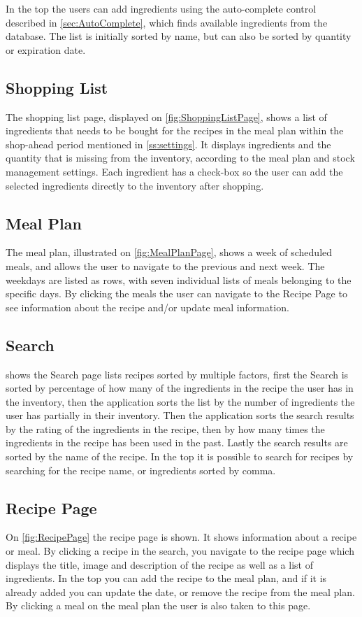 In the top the users can add ingredients using the auto-complete control described in \cref{sec:AutoComplete}, which finds available ingredients from the database. The list is initially sorted by name, but can also be sorted by quantity or expiration date.

\subsection{Shopping List}
The shopping list page, displayed on \cref{fig:ShoppingListPage}, shows a list of ingredients that needs to be bought for the recipes in the meal plan within the shop-ahead period mentioned in \cref{ss:settings}. It displays ingredients and the quantity that is missing from the inventory, according to the meal plan and stock management settings. Each ingredient has a check-box so the user can add the selected ingredients directly to the inventory after shopping.

\subsection{Meal Plan}
The meal plan, illustrated on \cref{fig:MealPlanPage}, shows a week of scheduled meals, and allows the user to navigate to the previous and next week. The weekdays are listed as rows, with seven individual lists of meals belonging to the specific days. By clicking the meals the  user can navigate to the Recipe Page to see information about the recipe and/or update meal information.

\subsection{Search}
 shows the Search page lists recipes sorted by multiple factors, first the Search is sorted by percentage of how many of the ingredients in the recipe the user has in the inventory, then the application sorts the list by the number of ingredients the user has partially in their inventory. Then the application sorts the search results by the rating of the ingredients in the recipe, then by how many times the ingredients in the recipe has been used in the past. Lastly the search results are sorted by the name of the recipe.
In the top it is possible to search for recipes by searching for the recipe name, or ingredients sorted by comma.

\subsection{Recipe Page}
On \cref{fig:RecipePage} the recipe page is shown. It shows information about a recipe or meal. By clicking a recipe in the search, you navigate to the recipe page which displays the title, image and description of the recipe as well as a list of ingredients. In the top you can add the recipe to the meal plan, and if it is already added you can update the date, or remove the recipe from the meal plan.
By clicking a meal on the meal plan the user is also taken to this page.

